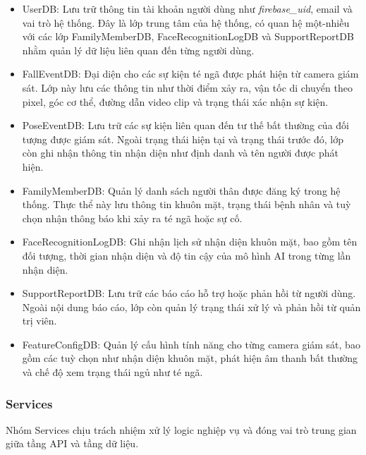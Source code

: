 \begin{itemize}
\item UserDB: Lưu trữ thông tin tài khoản người dùng như \textit{firebase\_uid}, email và vai trò hệ thống. Đây là lớp trung tâm của hệ thống, có quan hệ một-nhiều với các lớp FamilyMemberDB, FaceRecognitionLogDB và SupportReportDB nhằm quản lý dữ liệu liên quan đến từng người dùng.

\item FallEventDB: Đại diện cho các sự kiện té ngã được phát hiện từ camera giám sát. Lớp này lưu các thông tin như thời điểm xảy ra, vận tốc di chuyển theo pixel, góc cơ thể, đường dẫn video clip và trạng thái xác nhận sự kiện.

\item PoseEventDB: Lưu trữ các sự kiện liên quan đến tư thế bất thường của đối tượng được giám sát. Ngoài trạng thái hiện tại và trạng thái trước đó, lớp còn ghi nhận thông tin nhận diện như định danh và tên người được phát hiện.

\item FamilyMemberDB: Quản lý danh sách người thân được đăng ký trong hệ thống. Thực thể này lưu thông tin khuôn mặt, trạng thái bệnh nhân và tuỳ chọn nhận thông báo khi xảy ra té ngã hoặc sự cố.

\item FaceRecognitionLogDB: Ghi nhận lịch sử nhận diện khuôn mặt, bao gồm tên đối tượng, thời gian nhận diện và độ tin cậy của mô hình AI trong từng lần nhận diện.

\item SupportReportDB: Lưu trữ các báo cáo hỗ trợ hoặc phản hồi từ người dùng. Ngoài nội dung báo cáo, lớp còn quản lý trạng thái xử lý và phản hồi từ quản trị viên.

\item FeatureConfigDB: Quản lý cấu hình tính năng cho từng camera giám sát, bao gồm các tuỳ chọn như nhận diện khuôn mặt, phát hiện âm thanh bất thường và chế độ xem trạng thái ngủ như té ngã.

\end{itemize}

\subsubsection*{Services}

Nhóm Services chịu trách nhiệm xử lý logic nghiệp vụ và đóng vai trò trung gian giữa tầng API và tầng dữ liệu.


